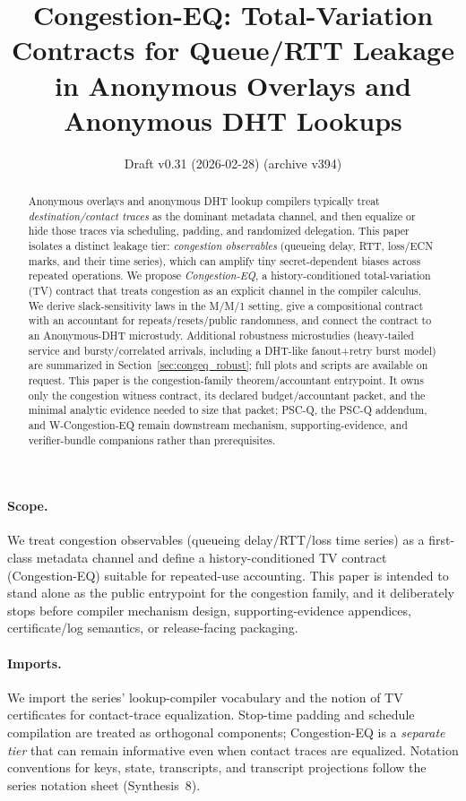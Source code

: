 \documentclass[11pt]{article}
\title{Congestion-EQ: Total-Variation Contracts for Queue/RTT Leakage \\ in Anonymous Overlays and Anonymous DHT Lookups}
\author{}
\date{Draft v0.31 (2026-02-28) (archive v394)}
\theoremstyle{definition}
\theoremstyle{remark}
\begin{document}
\maketitle

\begin{abstract}
Anonymous overlays and anonymous DHT lookup compilers typically treat \emph{destination/contact traces} as the dominant metadata channel, and then equalize or hide those traces via scheduling, padding, and randomized delegation.
This paper isolates a distinct leakage tier: \emph{congestion observables} (queueing delay, RTT, loss/ECN marks, and their time series), which can amplify tiny secret-dependent biases across repeated operations.
We propose \emph{Congestion-EQ}, a history-conditioned total-variation (TV) contract that treats congestion as an explicit channel in the compiler calculus.
We derive slack-sensitivity laws in the M/M/1 setting, give a compositional contract with an accountant for repeats/resets/public randomness, and connect the contract to an Anonymous-DHT microstudy.
Additional robustness microstudies (heavy-tailed service and bursty/correlated arrivals, including a DHT-like fanout+retry burst model) are summarized in Section~\ref{sec:congeq_robust}; full plots and scripts are available on request.
This paper is the congestion-family theorem/accountant entrypoint. It owns only the congestion witness contract, its declared budget/accountant packet, and the minimal analytic evidence needed to size that packet; PSC-Q, the PSC-Q addendum, and W-Congestion-EQ remain downstream mechanism, supporting-evidence, and verifier-bundle companions rather than prerequisites.\cite{series:pscq,series:pscqaddendum,series:wcongeq}
\end{abstract}
\paragraph{Scope.}
We treat congestion observables (queueing delay/RTT/loss time series) as a first-class metadata channel and define a history-conditioned TV contract (Congestion-EQ) suitable for repeated-use accounting. This paper is intended to stand alone as the public entrypoint for the congestion family, and it deliberately stops before compiler mechanism design, supporting-evidence appendices, certificate/log semantics, or release-facing packaging.\cite{series:pscq,series:pscqaddendum,series:wcongeq}

\paragraph{Imports.}
We import the series' lookup-compiler vocabulary and the notion of TV certificates for contact-trace equalization.\cite{series:schedcompiler,series:knapsacktransport}
Stop-time padding and schedule compilation are treated as orthogonal components; Congestion-EQ is a \emph{separate tier} that can remain informative even when contact traces are equalized.
Notation conventions for keys, state, transcripts, and transcript projections follow the series notation sheet (Synthesis~8).\cite{series:notation}
\end{document}
